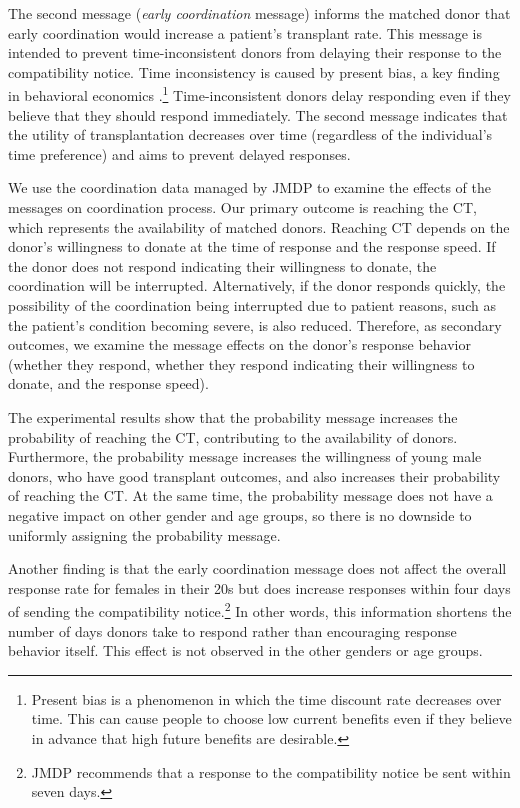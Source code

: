 \documentclass[12pt, a4paper]{article}
\begin{document}
The second message (\emph{early coordination} message) informs the matched donor that early coordination would increase a patient's transplant rate. This message is intended to prevent time-inconsistent donors from delaying their response to the compatibility notice. Time inconsistency is caused by present bias, a key finding in behavioral economics \citep{Laibson1997, ODonoghue2001}.\footnote{Present bias is a phenomenon in which the time discount rate decreases over time. This can cause people to choose low current benefits even if they believe in advance that high future benefits are desirable.} Time-inconsistent donors delay responding even if they believe that they should respond immediately. The second message indicates that the utility of transplantation decreases over time (regardless of the individual's time preference) and aims to prevent delayed responses.

We use the coordination data managed by JMDP to examine the effects of the messages on coordination process. Our primary outcome is reaching the CT, which represents the availability of matched donors. Reaching CT depends on the donor's willingness to donate at the time of response and the response speed. If the donor does not respond indicating their willingness to donate, the coordination will be interrupted. Alternatively, if the donor responds quickly, the possibility of the coordination being interrupted due to patient reasons, such as the patient's condition becoming severe, is also reduced. Therefore, as secondary outcomes, we examine the message effects on the donor's response behavior (whether they respond, whether they respond indicating their willingness to donate, and the response speed).

The experimental results show that the probability message increases the probability of reaching the CT, contributing to the availability of donors. Furthermore, the probability message increases the willingness of young male donors, who have good transplant outcomes, and also increases their probability of reaching the CT. At the same time, the probability message does not have a negative impact on other gender and age groups, so there is no downside to uniformly assigning the probability message.

Another finding is that the early coordination message does not affect the overall response rate for females in their 20s but does increase responses within four days of sending the compatibility notice.\footnote{JMDP recommends that a response to the compatibility notice be sent within seven days.} In other words, this information shortens the number of days donors take to respond rather than encouraging response behavior itself. This effect is not observed in the other genders or age groups.
\end{document}
